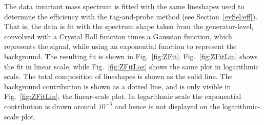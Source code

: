 
The data invariant mass spectrum is fitted with 
the same lineshapes used to determine the efficiency 
with the tag-and-probe method (see Section~\ref{evSel:eff}).  
That is, the data is fit with the \Zee spectrum 
shape taken from the generator-level, 
convolved with a Crystal Ball function 
times a Gaussian function, 
which represents the signal, 
while using an exponential function to represent 
the background.
The resulting fit is shown in Fig.~\ref{fig:ZFit}.  
Fig.~\ref{fig:ZFitLin} shows the fit in linear
scale, while Fig.~\ref{fig:ZFitLog} shows the
same plot in logarithmic scale.
The total composition of lineshapes is shown as the
solid line.
The background contribution is shown as a dotted line,
and is only visible in Fig.~\ref{fig:ZFitLin}, the
linear-scale plot.
In logarithmic scale the exponential contribution is
drawn around $10^{-3}$ and hence is not displayed
on the logarithmic-scale plot.


